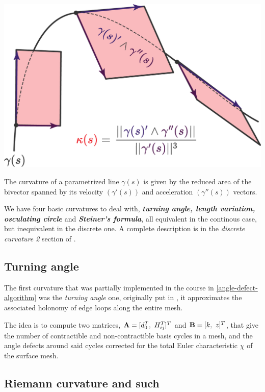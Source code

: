 \begin{marginfigure}
    \centering
    \includegraphics[width=1.0\linewidth]{images/curvature1.png}
    \caption{The curvature of a parametrized line $\gamma(s)$ is
    given by the reduced area of the bivector spanned by its velocity
    $(\gamma'(s))$ and acceleration $(\gamma''(s))$ vectors.}
\end{marginfigure}


\spa

We have four basic curvatures to deal with, \textit{\textbf{turning angle,
length variation, osculating circle}} and \textit{\textbf{Steiner's formula}},
all equivalent in the continous case, but inequivalent in the discrete one.
A complete description is in the \textit{discrete curvature 2} section of
\cite{discreteexterior1}.

\subsection{Turning angle}

The first curvature that was partially implemented in the course in
\ref{angle-defect-algorithm} was the \textit{turning angle} one, 
originally put in \cite{Crane:2010:TCD}, it approximates the associated
holonomy of edge loops along the entire mesh.

\spa

The idea is to compute two matrices, $\bf{A} = [d_0^T, \ H_{ij}^T]^T$
and $\bf{B} = [k, \ z]^T$, that give the number of contractible
and non-contractible basis cycles in a mesh, and the angle defects 
around said cycles corrected for the total Euler characteristic $\chi$
of the surface mesh.


\subsection{Riemann curvature and such}

